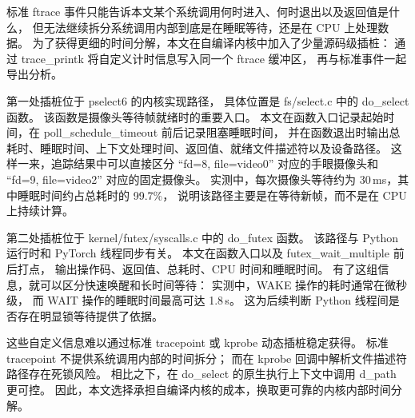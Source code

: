 标准 ftrace 事件只能告诉本文某个系统调用何时进入、何时退出以及返回值是什么，
但无法继续拆分系统调用内部到底是在睡眠等待，还是在 CPU 上处理数据。
为了获得更细的时间分解，本文在自编译内核中加入了少量源码级插桩：
通过 trace\_printk 将自定义计时信息写入同一个 ftrace 缓冲区，
再与标准事件一起导出分析。

第一处插桩位于 pselect6 的内核实现路径，
具体位置是 fs/select.c 中的 do\_select 函数。
该函数是摄像头等待帧就绪时的重要入口。
本文在函数入口记录起始时间，在 poll\_schedule\_timeout 前后记录阻塞睡眠时间，
并在函数退出时输出总耗时、睡眠时间、上下文处理时间、返回值、就绪文件描述符以及设备路径。
这样一来，追踪结果中可以直接区分
“fd=8, file=video0” 对应的手眼摄像头和
“fd=9, file=video2” 对应的固定摄像头。
实测中，每次摄像头等待约为 30\,ms，其中睡眠时间约占总耗时的 99.7\%，
说明该路径主要是在等待新帧，而不是在 CPU 上持续计算。

第二处插桩位于 kernel/futex/syscalls.c 中的 do\_futex 函数。
该路径与 Python 运行时和 PyTorch 线程同步有关。
本文在函数入口以及 futex\_wait\_multiple 前后打点，
输出操作码、返回值、总耗时、CPU 时间和睡眠时间。
有了这组信息，就可以区分快速唤醒和长时间等待：
实测中，WAKE 操作的耗时通常在微秒级，
而 WAIT 操作的睡眠时间最高可达 1.8\,s。
这为后续判断 Python 线程间是否存在明显锁等待提供了依据。

这些自定义信息难以通过标准 tracepoint 或 kprobe 动态插桩稳定获得。
标准 tracepoint 不提供系统调用内部的时间拆分；
而在 kprobe 回调中解析文件描述符路径存在死锁风险。
相比之下，在 do\_select 的原生执行上下文中调用 d\_path 更可控。
因此，本文选择承担自编译内核的成本，换取更可靠的内核内部时间分解。

